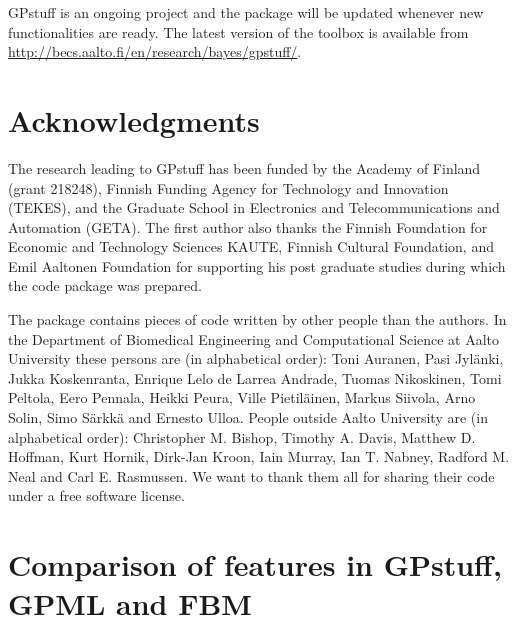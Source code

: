 \documentclass[twoside,11pt]{article}
\newcommand{\pkg}[1]{{\fontseries{b}\selectfont #1}}
\begin{document}
\pkg{GPstuff} is an ongoing project and the package will be updated
whenever new functionalities are ready. The latest version of the
toolbox is available from
\url{http://becs.aalto.fi/en/research/bayes/gpstuff/}. 

\section*{Acknowledgments}

The research leading to \pkg{GPstuff} has been funded by the Academy
of Finland (grant 218248), Finnish Funding Agency for Technology and
Innovation (TEKES), and the Graduate School in Electronics and
Telecommunications and Automation (GETA). The first author also thanks
the Finnish Foundation for Economic and Technology Sciences KAUTE,
Finnish Cultural Foundation, and Emil Aaltonen Foundation for
supporting his post graduate studies during which the code package was
prepared.

The package contains pieces of code written by other people than the
authors. In the Department of Biomedical Engineering and Computational
Science at Aalto University these persons are (in alphabetical order):
Toni Auranen, Pasi Jyl{\"a}nki, Jukka Koskenranta, Enrique Lelo de
Larrea Andrade, Tuomas Nikoskinen, Tomi Peltola, Eero Pennala, Heikki
Peura, Ville Pietil{\"a}inen, Markus Siivola, Arno Solin, Simo
S{\"a}rkk{\"a} and Ernesto Ulloa. People outside Aalto University are
(in alphabetical order): Christopher M. Bishop, Timothy A. Davis,
Matthew D. Hoffman, Kurt Hornik, Dirk-Jan Kroon, Iain Murray, Ian T.
Nabney, Radford M. Neal and Carl E. Rasmussen. We want to thank them all
for sharing their code under a free software license.




 \appendix

\section{Comparison of features in GPstuff, 
GPML and FBM}\label{appendix:comparison}
\end{document}
